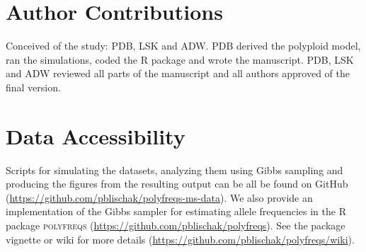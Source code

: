 \documentclass[11pt,english,letterpaper,oneside]{article}
\begin{document}
\singlespacing





\section*{Author Contributions}        %

Conceived of the study: PDB, LSK and ADW. PDB derived the polyploid model, ran the simulations, coded the R package and wrote the manuscript. PDB, LSK and ADW reviewed all parts of the manuscript and all authors approved of the final version.
\medskip

\section*{Data Accessibility}            %

Scripts for simulating the datasets, analyzing them using Gibbs sampling and producing the figures from the resulting output can be all be found on GitHub (\url{https://github.com/pblischak/polyfreqs-ms-data}). We also provide an implementation of the Gibbs sampler for estimating allele frequencies in the R package \textsc{polyfreqs} (\url{https://github.com/pblischak/polyfreqs}). See the package vignette or wiki for more details (\url{https://github.com/pblischak/polyfreqs/wiki}).
\vfill

\end{document}
